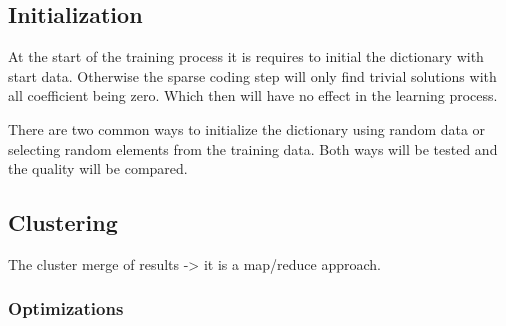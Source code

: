 \subsection{Initialization}
At the start of the training process it is requires to initial the
dictionary with start data. Otherwise the sparse coding step will only find
trivial solutions with all coefficient being zero. Which then will have no
effect in the learning process.

There are two common ways to initialize the dictionary using random data or
selecting random elements from the training data. Both ways will be tested and 
the quality will be compared.

\subsection{Clustering}

The cluster merge of results -> 
it is a map/reduce approach. 


\subsubsection*{Optimizations}

